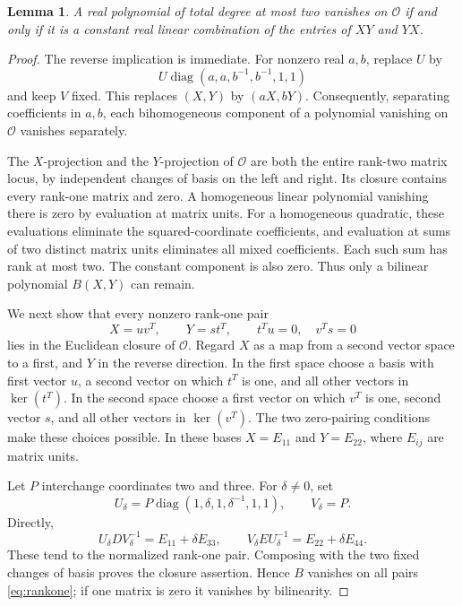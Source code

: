 \documentclass[11pt]{article}
\newcommand{\diag}{\operatorname{diag}}
\newtheorem{lemma}{Lemma}
\begin{document}
\begin{lemma}\label{lem:orbit}
A real polynomial of total degree at most two vanishes on
\(\mathcal O\) if and only if it is a constant real linear
combination of the entries of \(XY\) and \(YX\).
\end{lemma}

\begin{proof}
The reverse implication is immediate. For nonzero real \(a,b\),
replace \(U\) by
\[
 U\diag(a,a,b^{-1},b^{-1},1,1)
\]
and keep \(V\) fixed. This replaces \((X,Y)\) by \((aX,bY)\).
Consequently, separating coefficients in \(a,b\), each bihomogeneous
component of a polynomial vanishing on \(\mathcal O\) vanishes
separately.

The \(X\)-projection and the \(Y\)-projection of \(\mathcal O\)
are both the entire rank-two matrix locus, by independent changes
of basis on the left and right. Its closure contains every rank-one
matrix and zero. A homogeneous linear polynomial vanishing there
is zero by evaluation at matrix units. For a homogeneous quadratic,
these evaluations eliminate the squared-coordinate coefficients,
and evaluation at sums of two distinct matrix units eliminates all
mixed coefficients. Each such sum has rank at most two. The
constant component is also zero. Thus only a bilinear polynomial
\(B(X,Y)\) can remain.

We next show that every nonzero rank-one pair
\begin{equation}\label{eq:rankone}
 X=uv^T,\qquad Y=st^T,\qquad t^Tu=0,\quad v^Ts=0
\end{equation}
lies in the Euclidean closure of \(\mathcal O\).
Regard \(X\) as a map from a second vector space to a first, and
\(Y\) in the reverse direction. In the first space choose a basis
with first vector \(u\), a second vector on which \(t^T\) is one,
and all other vectors in \(\ker(t^T)\). In the second space choose
a first vector on which \(v^T\) is one, second vector \(s\), and
all other vectors in \(\ker(v^T)\). The two zero-pairing conditions
make these choices possible. In these bases \(X=E_{11}\) and
\(Y=E_{22}\), where \(E_{ij}\) are matrix units.

Let \(P\) interchange coordinates two and three. For \(\delta\ne0\),
set
\[
 U_\delta=P\diag(1,\delta,1,\delta^{-1},1,1),\qquad V_\delta=P.
\]
Directly,
\[
 U_\delta D V_\delta^{-1}=E_{11}+\delta E_{33},\qquad
 V_\delta E U_\delta^{-1}=E_{22}+\delta E_{44}.
\]
These tend to the normalized rank-one pair. Composing with the
two fixed changes of basis proves the closure assertion. Hence
\(B\) vanishes on all pairs \eqref{eq:rankone}; if one matrix is
zero it vanishes by bilinearity.


\end{proof}
\end{document}
